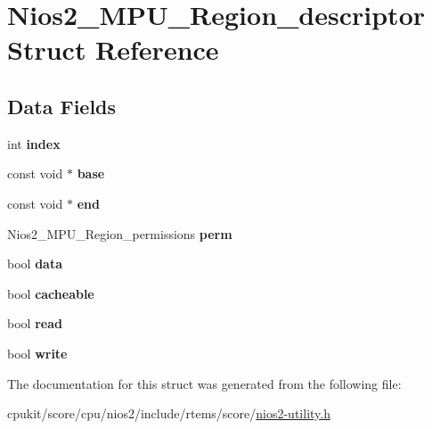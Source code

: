 \hypertarget{structNios2__MPU__Region__descriptor}{}\section{Nios2\+\_\+\+M\+P\+U\+\_\+\+Region\+\_\+descriptor Struct Reference}
\label{structNios2__MPU__Region__descriptor}
\subsection*{Data Fields}
\begin{DoxyCompactItemize}
\item 
\mbox{\label{structNios2__MPU__Region__descriptor_a687f3c0940955e4ba1fc5a50aa1fc957}} 
int {\bfseries index}
\item 
\mbox{\label{structNios2__MPU__Region__descriptor_a930ecf72425f1dff67ada64878ece17c}} 
const void $\ast$ {\bfseries base}
\item 
\mbox{\label{structNios2__MPU__Region__descriptor_a1a1598acce4afe7fa35b8aad247af346}} 
const void $\ast$ {\bfseries end}
\item 
\mbox{\label{structNios2__MPU__Region__descriptor_a0fccc6674d4aaca333d45f78e17d8b6f}} 
Nios2\+\_\+\+M\+P\+U\+\_\+\+Region\+\_\+permissions {\bfseries perm}
\item 
\mbox{\label{structNios2__MPU__Region__descriptor_a4586f8ebd1dbb0982662d042f6fea197}} 
bool {\bfseries data}
\item 
\mbox{\label{structNios2__MPU__Region__descriptor_ab1c34c2435aa55fa44db79958ba45f96}} 
bool {\bfseries cacheable}
\item 
\mbox{\label{structNios2__MPU__Region__descriptor_a70520809650700b2574b881622c153af}} 
bool {\bfseries read}
\item 
\mbox{\label{structNios2__MPU__Region__descriptor_a1e14b4992b209ae21df64ec16b15453b}} 
bool {\bfseries write}
\end{DoxyCompactItemize}


The documentation for this struct was generated from the following file\+:\begin{DoxyCompactItemize}
\item 
cpukit/score/cpu/nios2/include/rtems/score/\mbox{\hyperlink{nios2-utility_8h}{nios2-\/utility.\+h}}\end{DoxyCompactItemize}
